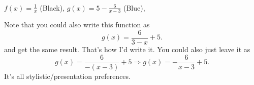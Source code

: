 \begin{solution}
\begin{center}
\\
    $f(x) = \frac{1}{x}$ (Black), 
    $g(x) = 5 - \frac{6}{x - 3}$ (Blue),
\end{center}
Note that you could also write this function as
\[
    g(x) = \frac{6}{3 - x} + 5 \text{.}
\]
and get the same result. That's how I'd write it. You could also just leave it as
\[
    g(x) = \frac{6}{-(x - 3)} + 5 \Longrightarrow \boxed{g(x) = -\frac{6}{x - 3} + 5} \text{.}
\]
It's all stylistic/presentation preferences.
\end{solution}